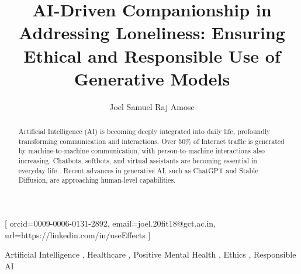 

\title{AI-Driven Companionship in Addressing Loneliness: Ensuring Ethical and Responsible Use of Generative Models}

\author{Joel Samuel Raj Amose}[
    orcid=0009-0006-0131-2892,
    email=joel.20fit18@gct.ac.in,
    url=https://linkedin.com/in/useEffects
]

\begin{abstract}
    Artificial Intelligence (AI) is becoming deeply integrated into daily life, profoundly transforming communication and interactions. Over 50\% of Internet traffic is generated by machine-to-machine communication, with person-to-machine interactions also increasing. Chatbots, softbots, and virtual assistants are becoming essential in everyday life \cite{elliott2019culture}. Recent advances in generative AI, such as ChatGPT and Stable Diffusion, are approaching human-level capabilities.
\end{abstract}

\begin{keywords}
    Artificial Intelligence \sep
    Healthcare \sep
    Positive Mental Health \sep
    Ethics \sep
    Responsible AI
\end{keywords}

\maketitle
